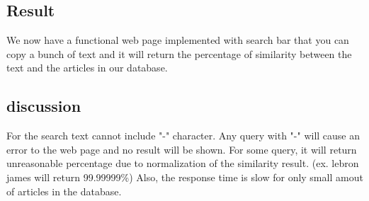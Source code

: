 \subsection{Result}
We now have a functional web page implemented with search bar that you can copy a bunch of text and it will return the percentage of similarity between the text and the articles in our database. 

\subsection{discussion}
For the search text cannot include "-" character. Any query with "-" will cause an error to the web page and no result will be shown. For some query, it will return unreasonable percentage due to normalization of the similarity result. (ex. lebron james will return 99.99999\%)
Also, the response time is slow for only small amout of articles in the database.